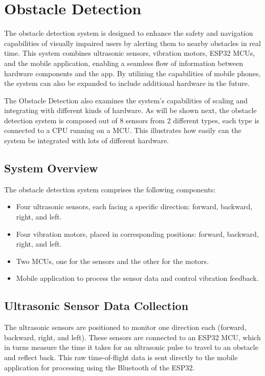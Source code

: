 \section{Obstacle Detection}
\label{Obstacle Detection Methodology Section}

The obstacle detection system is designed to enhance the safety and navigation capabilities of visually impaired users by alerting them to nearby obstacles in real time. This system combines ultrasonic sensors, vibration motors, ESP32 MCUs, and the mobile application, enabling a seamless flow of information between hardware components and the app. By utilizing the capabilities of mobile phones, the system can also be expanded to include additional hardware in the future.

The Obstacle Detection also examines the system's capabilities of scaling and integrating with different kinds of hardware. As will be shown next, the obstacle detection system is composed out of 8 sensors from 2 different types, each type is connected to a CPU running on a MCU. This illustrates how easily can the system be integrated with lots of different hardware.

\subsection{System Overview}

The obstacle detection system comprises the following components:

\begin{itemize}
	\item Four ultrasonic sensors, each facing a specific direction: forward, backward, right, and left.
	\item Four vibration motors, placed in corresponding positions: forward, backward, right, and left.
	\item Two MCUs, one for the sensors and the other for the motors.
	\item Mobile application to process the sensor data and control vibration feedback.
\end{itemize}

\subsection{Ultrasonic Sensor Data Collection}

The ultrasonic sensors are positioned to monitor one direction each (forward, backward, right, and left). These sensors are connected to an ESP32 MCU, which in turns measure the time it takes for an ultrasonic pulse to travel to an obstacle and reflect back. This raw time-of-flight data is sent directly to the mobile application for processing using the Bluetooth of the ESP32.

